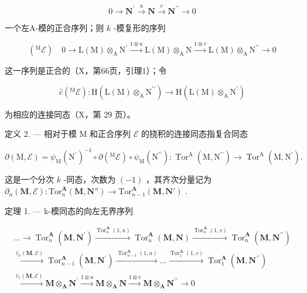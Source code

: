 \[
0 \rightarrow \mathbf {N} ^ {\prime} \xrightarrow {u} \mathbf {N} \xrightarrow {v} \mathbf {N} ^ {\prime \prime} \rightarrow 0
\]

一个左A-模的正合序列；则 \(k\) -模复形的序列

\[
\left(^ {\mathrm{M}} \mathcal {E}\right) \quad 0 \longrightarrow \mathrm{L} (\mathrm{M}) \otimes_ {\mathrm{A}} \mathrm{N} ^ {\prime} \xrightarrow {1 \otimes u} \mathrm{L} (\mathrm{M}) \otimes_ {\mathrm{A}} \mathrm{N} \xrightarrow {1 \otimes v} \mathrm{L} (\mathrm{M}) \otimes_ {\mathrm{A}} \mathrm{N} ^ {\prime \prime} \longrightarrow 0
\]

这一序列是正合的（X，第66页，引理1）；令

\[
\hat {c} \left(^ {\mathrm{M}} \mathcal {E}\right): \mathrm{H} (\mathrm{L} (\mathrm{M}) \otimes_ {\mathrm{A}} \mathrm{N} ^ {\prime \prime}) \rightarrow \mathrm{H} (\mathrm{L} (\mathrm{M}) \otimes_ {\mathrm{A}} \mathrm{N} ^ {\prime})
\]

为相应的连接同态（X，第 29 页）。

定义 2. --- 相对于模 M 和正合序列 \(\mathcal{E}\) 的挠积的连接同态指复合同态

\[
\partial (\mathrm{M}, \mathcal {E}) = \psi_ {\mathrm{M}} \left(\mathrm{N} ^ {\prime}\right) ^ {- 1} \circ \partial \left(^ {\mathrm{M}} \mathcal {E}\right) \circ \psi_ {\mathrm{M}} \left(\mathrm{N} ^ {\prime \prime}\right): \operatorname{Tor} ^ {\mathrm{A}} \left(\mathrm{M}, \mathrm{N} ^ {\prime \prime}\right)\rightarrow \operatorname{Tor} ^ {\mathrm{A}} \left(\mathrm{M}, \mathrm{N} ^ {\prime}\right).
\]

这是一个分次 \(k\) -同态，次数为 \((-1)\) ，其齐次分量记为 \(\partial_n(\mathbf{M}, \mathcal{E}) : \mathrm{Tor}_n^{\mathbf{A}}(\mathbf{M}, \mathbf{N}'') \to \mathrm{Tor}_{n-1}^{\mathbf{A}}(\mathbf{M}, \mathbf{N}')\) .

定理 1. --- k-模同态的向左无界序列

\[
\begin{array}{l} \dots \longrightarrow \operatorname{Tor} _ {n} ^ {\mathbf {A}} (\mathbf {M}, \mathbf {N} ^ {\prime}) \xrightarrow {\operatorname{Tor} _ {n} ^ {\mathbf {A}} (1 , u)} \operatorname{Tor} _ {n} ^ {\mathbf {A}} (\mathbf {M}, \mathbf {N}) \xrightarrow {\operatorname{Tor} _ {n} ^ {\mathbf {A}} (1 , v)} \operatorname{Tor} _ {n} ^ {\mathbf {A}} (\mathbf {M}, \mathbf {N} ^ {\prime \prime}) \\ \xrightarrow {\hat {c} _ {n} (\mathbf {M} , \mathcal {E})} \operatorname{Tor} _ {n - 1} ^ {\mathbf {A}} (\mathbf {M}, \mathbf {N} ^ {\prime}) \xrightarrow {\operatorname{Tor} _ {n - 1} ^ {\mathbf {A}} (1 , u)} \dots \xrightarrow {\operatorname{Tor} _ {1} ^ {\mathbf {A}} (1 , v)} \operatorname{Tor} _ {1} ^ {\mathbf {A}} (\mathbf {M}, \mathbf {N} ^ {\prime \prime}) \\ \xrightarrow {\hat {c} _ {1} (\mathbf {M} , \mathcal {E})} \mathbf {M} \otimes_ {\mathbf {A}} \mathbf {N} ^ {\prime} \xrightarrow {1 \otimes u} \mathbf {M} \otimes_ {\mathbf {A}} \mathbf {N} \xrightarrow {1 \otimes v} \mathbf {M} \otimes_ {\mathbf {A}} \mathbf {N} ^ {\prime \prime} \longrightarrow 0 \end{array}
\]

